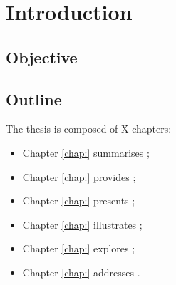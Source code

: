 \chapter{Introduction}
\label{chap:intro}



\lipsum[1]




\section{Objective}
\label{sec:objective}

\lipsum[2-5]




\section{Outline}
\label{sec:outline}


The thesis is composed of X chapters:
\begin{itemize}
	\item Chapter \ref{chap:} summarises ;
	
	\item Chapter \ref{chap:} provides ;
	
	\item Chapter \ref{chap:} presents ;
		
	\item Chapter \ref{chap:} illustrates ;

	\item Chapter \ref{chap:} explores ;	
	
	\item Chapter \ref{chap:} addresses .
\end{itemize}





